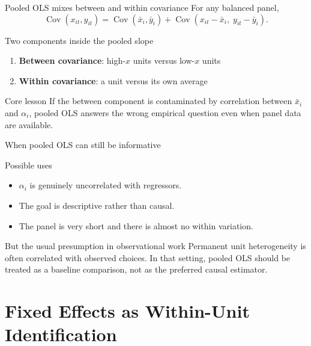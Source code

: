 \documentclass[10pt]{beamer}
\DeclareMathOperator{\Cov}{Cov}
\begin{document}
\begin{frame}{Pooled OLS mixes between and within covariance}
\label{slide:covdecomp}
\small
For any balanced panel,
\[
\Cov(x_{it}, y_{it})
=
\Cov(\bar{x}_i, \bar{y}_i)
+ \Cov(x_{it}-\bar{x}_i,\; y_{it}-\bar{y}_i).
\]

\begin{block}{Two components inside the pooled slope}
\begin{enumerate}
  \item \textbf{Between covariance}: high-$x$ units versus low-$x$ units
  \item \textbf{Within covariance}: a unit versus its own average
\end{enumerate}
\end{block}

\pause
\begin{alertblock}{Core lesson}
If the between component is contaminated by correlation between $\bar{x}_i$ and $\alpha_i$, pooled OLS answers the wrong empirical question even when panel data are available.
\end{alertblock}

\hfill\hyperlink{app:covproof}{}
\end{frame}

\begin{frame}{When pooled OLS can still be informative}
\label{slide:pooleduse}
\small
\begin{block}{Possible uses}
\begin{itemize}
  \item $\alpha_i$ is genuinely uncorrelated with regressors.
  \item The goal is descriptive rather than causal.
  \item The panel is very short and there is almost no within variation.
\end{itemize}
\end{block}

\pause
\begin{alertblock}{But the usual presumption in observational work}
Permanent unit heterogeneity is often correlated with observed choices. In that setting, pooled OLS should be treated as a baseline comparison, not as the preferred causal estimator.
\end{alertblock}
\end{frame}

\section{Fixed Effects as Within-Unit Identification}
\end{document}
